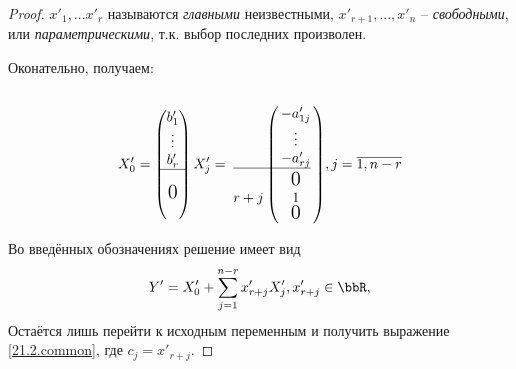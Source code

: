 \begin{proof}
  $x'_1,...x'_r$ называются \textit{главными} неизвестными, $x'_{r+1},...,x'_n$ -- \textit{свободными}, или \textit{параметрическими}, т.к. выбор последних произволен.
  
  Оконательно, получаем:
  \begin{equation}
  X'_0=\begin{pmatrix} b'_1\\ \vdots \\b'_r \\ \hline \\ \fudge 0 \\ \\ \end{pmatrix}
  X'_j=\bordermatrix{
      & \cr
      & -a'_{1j} \cr
      & \vdots  \cr
      & -a'_{rj} \cr \hline
      &   \cr
      & \fudge 0 \cr
   r+j& 1 \cr
      & \fudge 0 \cr
  }, j=\overline{1,n-r}
  \end{equation}
  
  Во введённых обозначениях решение имеет вид
  \begin{equation*}
   Y'=X'_0+\sum_{j=1}^{n-r}x'_{r+j}X'_j, x'_{r+j} \in \bbR,
  \end{equation*}
  Остаётся лишь перейти к исходным переменным и получить выражение \ref{21.2.common}, где $c_j=x'_{r+j}$.
  \end{proof}